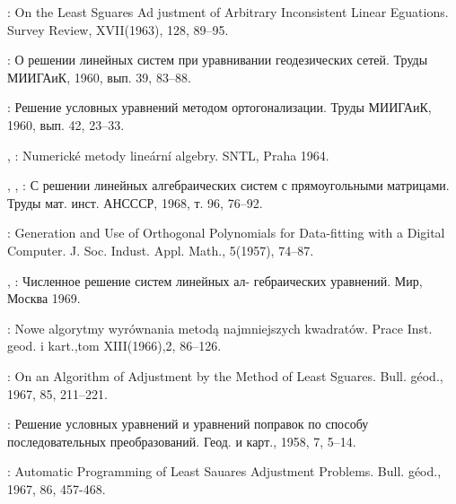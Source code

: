 \begin{enumerate}[label={[\arabic*]}]
\item {}: On the Least Sguares Ad justment of Arbitrary
  Inconsistent Linear Eguations. Survey Review, XVII(1963), 128,
  89--95.

\item {}: О решении линейных систем при уравнивании
  геодезических сетей. Труды МИИГАиК, 1960, вып. 39, 83--88.

\item {}: Решение условных уравнений методом
  ортогонализации.  Труды МИИГАиК, 1960, вып. 42, 23--33.


\item {}, : 
  Numerické metody lineární algebry. SNTL, Praha 1964.

\item {}, ,
  : С решении линейных алгебраических систем с
  прямоугольными матрицами.  Труды мат. инст. АНСССР, 1968, т. 96,
  76--92.

\item {}: Generation and Use of Orthogonal
  Polynomials for Data-fitting with a Digital
  Computer. J. Soc. Indust.  Appl. Math., 5(1957), 74--87.

\item {}, : Численное решение систем
  линейных ал- гебраических уравнений. Мир, Москва 1969.

\item {}: Nowe algorytmy wyrównania metodą
  najmniejszych kwadratów.  Prace Inst. geod. i kart.,tom
  XIII(1966),2, 86--126.

\item {}: On an Algorithm of Adjustment by the Method
  of Least Sguares. Bull. géod., 1967, 85, 211--221.

\item {}: Решение условных уравнений и уравнений
  поправок по способу последовательных преобразований. Геод. и карт.,
  1958, 7, 5--14.

\item {}: Automatic Programming of Least Sauares
  Adjustment Problems. Bull. géod., 1967, 86, 457-468.


\end{enumerate}
